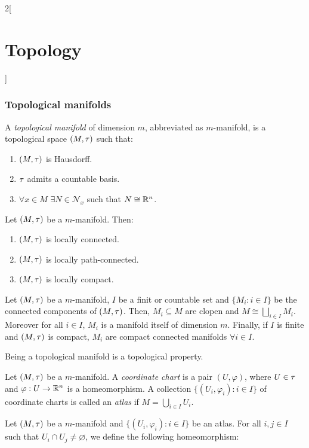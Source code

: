 \documentclass[../../../main.tex]{subfiles}
\begin{document}
\begin{multicols}{2}[\section{Topology}]
  \subsubsection{Topological manifolds}
  \begin{definition}
    A \emph{topological manifold} of dimension $m$, abbreviated as $m$-manifold, is a topological space $(M,\tau)$ such that:
    \begin{enumerate}
      \item $(M,\tau)$ is Hausdorff.
      \item $\tau$ admits a countable basis.
      \item $\forall x\in M$ $\exists N\in\mathcal{N}_x$ such that $N\cong\mathbb{R}^n$.
    \end{enumerate}
  \end{definition}
  \begin{proposition}
    Let $(M,\tau)$ be a $m$-manifold. Then:
    \begin{enumerate}
      \item $(M,\tau)$ is locally connected.
      \item $(M,\tau)$ is locally path-connected.
      \item $(M,\tau)$ is locally compact.
    \end{enumerate}
  \end{proposition}
  \begin{corollary}
    Let $(M,\tau)$ be a $m$-manifold, $I$ be a finit or countable set and $\{M_i:i\in I\}$ be the connected components of $(M,\tau)$. Then, $M_i\subseteq M$ are clopen and $M\cong\bigsqcup_{i\in I}M_i$. Moreover for all $i\in I$, $M_i$ is a manifold itself of dimension $m$. Finally, if $I$ is finite and $(M,\tau)$ is compact, $M_i$ are compact connected manifolds $\forall i\in I$.
  \end{corollary}
  \begin{proposition}
    Being a topological manifold is a topological property.
  \end{proposition}
  \begin{definition}
    Let $(M,\tau)$ be a $m$-manifold. A \emph{coordinate chart} is a pair $(U,\varphi)$, where $U\in\tau$ and $\varphi:U\rightarrow\mathbb{R}^n$ is a homeomorphism. A collection $\{(U_i,\varphi_i):i\in I\}$ of coordinate charts is called an \emph{atlas} if $M=\bigcup_{i\in I}U_i$.
  \end{definition}
  \begin{definition}
    Let $(M,\tau)$ be a $m$-manifold and $\{(U_i,\varphi_i):i\in I\}$ be an atlas. For all $i,j\in I$ such that $U_i\cap U_j\ne \varnothing$, we define the following homeomorphism: $$
$$
\end{definition}
\end{multicols}
\end{document}

